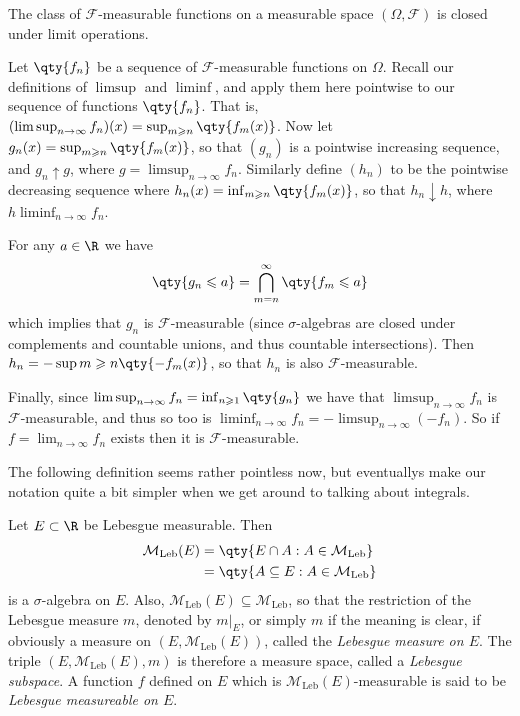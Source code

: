 \documentclass{maths}
\newcommand{\mleb}{\mathcal{M}_{\text{Leb}}}
\newcommand{\alg}{\mathcal{F}}
\begin{document}
\begin{thm}
    The class of $\alg$-measurable functions on a measurable space $(\Omega,\alg)$ is closed under limit operations.
\end{thm}

\begin{prf}
    Let $\qty{f_n}$ be a sequence of $\alg$-measurable functions on $\Omega$.
    Recall our definitions of $\limsup$ and $\liminf$, and apply them here pointwise to our sequence of functions $\qty{f_n}$.
    That is, $(\limsup_{n\to\infty} f_n)(x) = \sup_{m\geqslant n}\qty{f_m(x)}$.
    Now let $g_n(x)=\sup_{m\geqslant n}\qty{f_m(x)}$, so that $(g_n)$ is a pointwise increasing sequence, and $g_n\uparrow g$, where $g=\limsup_{n\to\infty} f_n$.
    Similarly define $(h_n)$ to be the pointwise decreasing sequence where $h_n(x)=\inf_{m\geqslant n}\qty{f_m(x)}$, so that $h_n\downarrow h$, where $h\liminf_{n\to\infty} f_n$.

    For any $a\in\R$ we have
    \[
        \qty{g_n \leqslant a} =
        \bigcap_{m=n}^{\infty} \qty{f_m \leqslant a}
    \]
    which implies that $g_n$ is $\alg$-measurable (since $\sigma$-algebras are closed under complements and countable unions, and thus countable intersections).
    Then $h_n = -\sup{m\geqslant n}\qty{-f_m(x)}$, so that $h_n$ is also $\alg$-measurable.

    Finally, since $\limsup_{n\to\infty} f_n = \inf_{n\geqslant 1}\qty{g_n}$ we have that $\limsup_{n\to\infty} f_n$ is $\alg$-measurable, and thus so too is $\liminf_{n\to\infty} f_n = -\limsup_{n\to\infty} (-f_n)$.
    So if $f=\lim_{n\to\infty} f_n$ exists then it is $\alg$-measurable.
\end{prf}

The following definition seems rather pointless now, but eventuallys make our notation quite a bit simpler when we get around to talking about integrals.

\begin{defn}
    Let $E\subset\R$ be Lebesgue measurable.
    Then
    \begin{align*}
        \mleb(E)
        &= \qty{E\cap A : A\in\mleb}\\
        &= \qty{A\subseteq E : A\in\mleb}
    \end{align*}
    is a $\sigma$-algebra on $E$.
    Also, $\mleb(E)\subseteq\mleb$, so that the restriction of the Lebesgue measure $m$, denoted by $m|_E$, or simply $m$ if the meaning is clear, if obviously a measure on $(E,\mleb(E))$, called the \emph{Lebesgue measure on $E$}.
    The triple $(E,\mleb(E),m)$ is therefore a measure space, called a \emph{Lebesgue subspace}.
    A function $f$ defined on $E$ which is $\mleb(E)$-measurable is said to be \emph{Lebesgue measureable on $E$}.
\end{defn}
\end{document}
